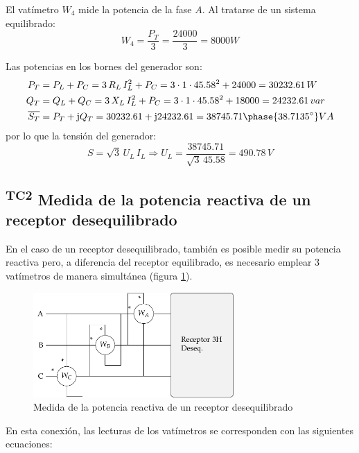 \begin{example}
El vatímetro $W_4$ mide la potencia de la fase $A$. Al tratarse de un sistema equilibrado:
\begin{equation*}
    W_4=\dfrac{P_T}{3}=\dfrac{24000}{3}=8000W
\end{equation*}

Las potencias en los bornes del generador son:
\begin{align*}
    P_T&=P_L+P_C=3\,R_L\,I_L^2+P_C=3\cdot 1\cdot 45.58^2+24000=30232.61\,W\\
    Q_T&=Q_L+Q_C=3\,X_L\,I_L^2+P_C=3\cdot 1\cdot 45.58^2+18000=24232.61\,var\\
    \overline{S_T}&=P_T+\mathrm{j}Q_T=30232.61+\mathrm{j}24232.61=38745.71\phase{38.7135^\circ} VA
\end{align*}
por lo que la tensión del generador:
\begin{equation*}
    S=\sqrt{3}\,U_L\, I_L\Rightarrow U_L=\dfrac{38745.71}{\sqrt{3}\,45.58}=490.78\,V
\end{equation*}
\end{example}

\subsection{\textsuperscript{TC2} Medida de la potencia reactiva de un
  receptor desequilibrado}
\label{sec:medida-potencia-des}

En el caso de un receptor desequilibrado, también es posible medir su
potencia reactiva pero, a diferencia del receptor equilibrado, es
necesario emplear 3 vatímetros de manera simultánea (figura
\ref{fig:medida-potencia-des}).

\begin{figure}[H]
  \centering
  \includegraphics[height=4cm]{../figs/Reactiva_3H_deseq.pdf}
  \caption{Medida de la potencia reactiva de un receptor
    desequilibrado}
  \label{fig:medida-potencia-des}
\end{figure}

En esta conexión, las lecturas de los vatímetros se corresponden con
las siguientes ecuaciones:

